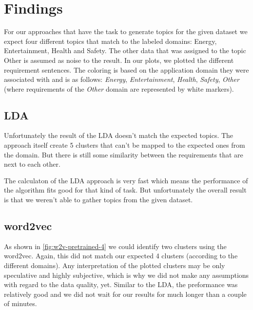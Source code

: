 \section{Findings} %
\label{sec:findings}

For our approaches that have the task to generate topics for the given dataset we expect four different topics that match to the labeled domains: Energy, Entertainment, Health and Safety. The other data that was assigned to the topic Other is assumed as noise to the result.
In our plots, we plotted the different requirement sentences. The coloring is based on the application domain they were associated with and is as follows: \textcolor{clr_energy}{\emph{Energy}}, \textcolor{clr_entertainment}{\emph{Entertainment}}, \textcolor{clr_health}{\emph{Health}}, \textcolor{clr_safety}{\emph{Safety}}, \emph{Other} (where requirements of the \emph{Other} domain are represented by white markers).

\subsection{LDA} %
\label{sub:findings_lda}

Unfortunately the result of the LDA doesn't match the expected topics. The approach itself create 5 clusters that can't be mapped to the expected ones from the domain. But there is still some similarity between the requirements that are next to each other.

The calculaton of the LDA approach is very fast which means the performance of the algorithm fits good for that kind of task. But unfortunately the overall result is that we weren't able to gather topics from the given dataset.

\subsection{word2vec} %
\label{sub:findings_w2v}
As shown in \autoref{fig:w2v-pretrained-4} we could identify two clusters using the word2vec. Again, this did not match our expected 4 clusters (according to the different domains). Any interpretation of the plotted clusters may be only speculative and highly subjective, which is why we did not make any assumptions with regard to the data quality, yet.
Similar to the LDA, the preformance was relatively good and we did not wait for our results for much longer than a couple of minutes.

